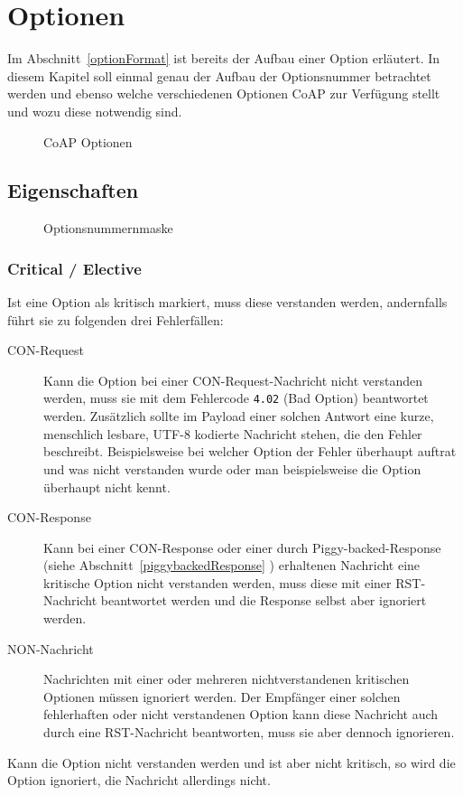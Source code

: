 \section{Optionen}
Im Abschnitt~\ref{optionFormat}  ist bereits der Aufbau einer Option erläutert.
In diesem Kapitel soll einmal genau der Aufbau der Optionsnummer betrachtet werden und ebenso
welche verschiedenen Optionen CoAP zur Verfügung stellt und wozu diese notwendig sind.
\begin{figure}[htbp]
    \centering
    \begin{minipage}{.97\textwidth}
    
    \caption{CoAP Optionen}
    \end{minipage}
    \label{table:coapOptions}
\end{figure}
\subsection{Eigenschaften}
\begin{figure}[htbp]
    \centering
    \begin{minipage}{.5\textwidth}
    
    \caption{Optionsnummernmaske}
    \end{minipage}
    \label{table:optionnumbermask}
\end{figure}
\subsubsection{Critical / Elective}
Ist eine Option als kritisch markiert, muss diese verstanden werden, andernfalls führt sie zu
folgenden drei Fehlerfällen:
\begin{description}
  \item [\ac{CON}-Request] 
  Kann die Option bei einer \ac{CON}-Request-Nachricht nicht verstanden
werden, muss sie mit dem Fehlercode \verb!4.02! (Bad Option) beantwortet werden.
Zusätzlich sollte im Payload einer solchen Antwort eine kurze,
menschlich lesbare, \ac{UTF-8} kodierte Nachricht stehen, die den Fehler beschreibt.
Beispielsweise bei welcher Option der Fehler überhaupt auftrat und was nicht
verstanden wurde oder man beispielsweise die Option überhaupt nicht kennt.
  \item [\ac{CON}-Response]
  Kann bei einer \ac{CON}-Response oder einer durch
Piggy-backed-Response (siehe Abschnitt~\ref{piggybackedResponse} ) 
erhaltenen Nachricht eine kritische Option nicht verstanden werden, muss
diese mit einer \ac{RST}-Nachricht beantwortet werden und die Response selbst aber ignoriert
werden.
  \item [\ac{NON}-Nachricht]
  Nachrichten mit einer oder mehreren nichtverstandenen kritischen Optionen müssen ignoriert
  werden.
  Der Empfänger einer solchen fehlerhaften oder nicht verstandenen Option kann diese Nachricht auch
  durch eine \ac{RST}-Nachricht beantworten, muss sie aber dennoch ignorieren. 
\end{description}
Kann die Option nicht verstanden werden und ist aber nicht kritisch, so wird die Option ignoriert,
die Nachricht allerdings nicht.


